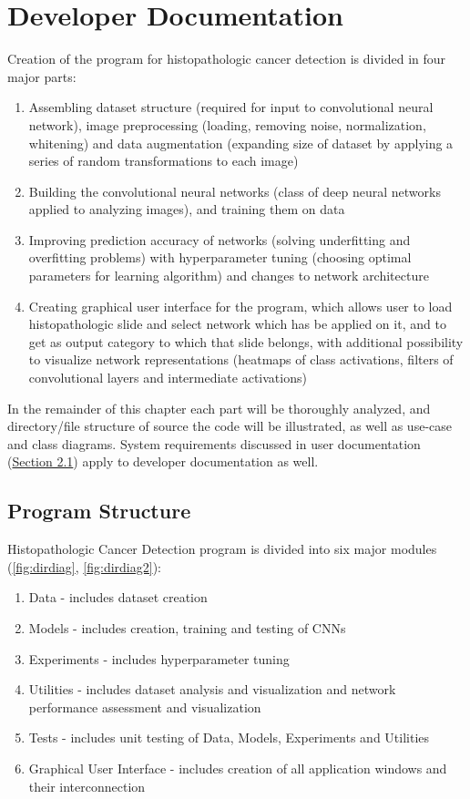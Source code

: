 \chapter{Developer Documentation} %
\label{ch:impl}

Creation of the program for histopathologic cancer detection is divided in four major parts:
\begin{enumerate}
	\itemsep0em
	\item Assembling dataset structure (required for input to convolutional neural network), image preprocessing (loading, removing noise, normalization, whitening) and data augmentation (expanding size of dataset by applying a series of random transformations to each image)
	\item Building the convolutional neural networks (class of deep neural networks applied to analyzing images), and training them on data
	\item Improving prediction accuracy of networks (solving underfitting and overfitting problems) with hyperparameter tuning (choosing optimal parameters for learning algorithm) and changes to network architecture
	\item Creating graphical user interface for the program, which allows user to load histopathologic slide and select network which has be applied on it, and to get as output category to which that slide belongs, with additional possibility to visualize network representations (heatmaps of class activations, filters of convolutional layers and intermediate activations)
\end{enumerate}
In the remainder of this chapter each part will be thoroughly analyzed, and directory/file structure of source the code will be illustrated, as well as use-case and class diagrams. System requirements discussed in user documentation (\textcolor{red}{\hyperref[sysreq]{Section 2.1}}) apply to developer documentation as well. 
\clearpage

\section{Program Structure}

Histopathologic Cancer Detection program is divided into six major modules (\textcolor{red}{\autoref{fig:dirdiag}}, \textcolor{red}{\autoref{fig:dirdiag2}}):
\begin{enumerate}
	\itemsep 0em
	\item Data - includes dataset creation
	\item Models - includes creation, training and testing of CNNs
	\item Experiments - includes hyperparameter tuning
	\item Utilities - includes dataset analysis and visualization and network performance assessment and visualization
	\item Tests - includes unit testing of Data, Models, Experiments and Utilities
	\item Graphical User Interface - includes creation of all application windows and their interconnection
\end{enumerate}

